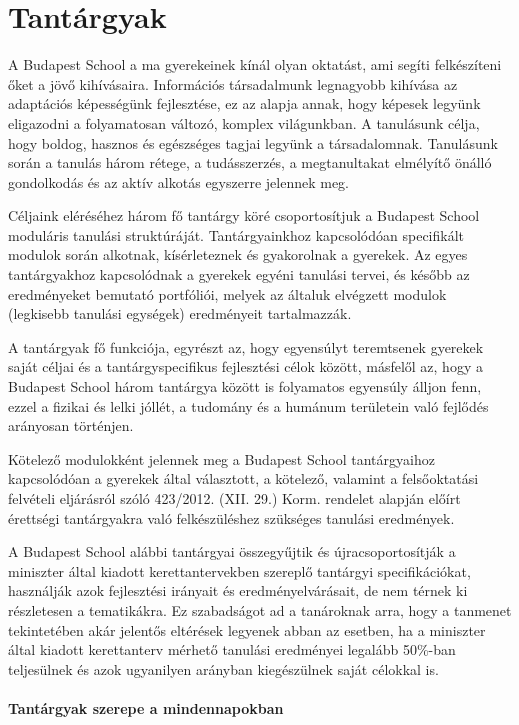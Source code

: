 \section{Tantárgyak}
\label{sec:tantargyak}
A Budapest School a ma gyerekeinek kínál olyan oktatást, ami segíti
felkészíteni őket a jövő kihívásaira. Információs társadalmunk legnagyobb
kihívása az adaptációs képességünk fejlesztése, ez az alapja annak, hogy
képesek legyünk eligazodni a folyamatosan változó, komplex világunkban. A
tanulásunk célja, hogy boldog, hasznos és egészséges tagjai legyünk a
társadalomnak. Tanulásunk során a tanulás három rétege, a tudásszerzés, a
megtanultakat elmélyítő önálló gondolkodás és az aktív alkotás egyszerre
jelennek meg. 

Céljaink eléréséhez három fő tantárgy köré csoportosítjuk a
Budapest School moduláris tanulási struktúráját. Tantárgyainkhoz kapcsolódóan
specifikált modulok során alkotnak, kísérleteznek és gyakorolnak a gyerekek. Az egyes tantárgyakhoz kapcsolódnak a gyerekek egyéni tanulási
tervei, és később az eredményeket bemutató portfóliói, melyek az általuk
elvégzett modulok (legkisebb tanulási egységek) eredményeit tartalmazzák.

A tantárgyak fő funkciója, egyrészt az, hogy egyensúlyt teremtsenek gyerekek
saját céljai és a tantárgyspecifikus fejlesztési célok között, másfelől az,
hogy a Budapest School három tantárgya között is folyamatos egyensúly álljon
fenn, ezzel a fizikai és lelki jóllét, a tudomány és a humánum területein való
fejlődés arányosan történjen.

Kötelező modulokként jelennek meg a Budapest School tantárgyaihoz kapcsolódóan
a gyerekek által választott, a kötelező, valamint a felsőoktatási felvételi
eljárásról szóló 423/2012. (XII. 29.) Korm. rendelet alapján előírt érettségi
tantárgyakra való felkészüléshez szükséges tanulási eredmények.

A Budapest School alábbi tantárgyai összegyűjtik és újracsoportosítják a
miniszter által kiadott kerettantervekben szereplő tantárgyi specifikációkat,
használják azok fejlesztési irányait és eredményelvárásait, de nem térnek ki
részletesen a tematikákra. Ez szabadságot ad a tanároknak arra, hogy a
tanmenet tekintetében akár jelentős eltérések legyenek abban az esetben, ha a
miniszter által kiadott kerettanterv mérhető tanulási eredményei legalább 50\%-ban
teljesülnek és azok ugyanilyen arányban kiegészülnek saját célokkal is.

\paragraph{Tantárgyak szerepe a mindennapokban}

